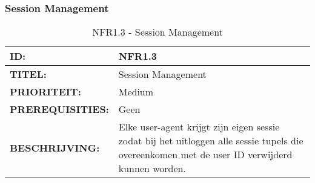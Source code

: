 \subsubsection{Session Management}
	\begin{table}[H]
	\caption{NFR1.3 - Session Management}
    		\begin{tabular}{l | p{10cm}}
        \textbf{ID:} & NFR1.3 \\ \hline
        \textbf{TITEL:} & Session Management \\ \hline
        \textbf{PRIORITEIT:} &  Medium \\ \hline
        \textbf{PREREQUISITIES:} & Geen\\ \hline
        \textbf{BESCHRIJVING:} & Elke user-agent krijgt zijn eigen sessie zodat bij het uitloggen alle sessie tupels die overeenkomen met de user ID verwijderd kunnen worden.\\
    \end{tabular} 
	\label{tab:NFR1.3 -Session Management}
\end{table}